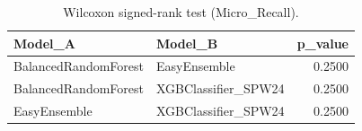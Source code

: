 \begin{table}[t]
\centering
\begin{tabular}{llr}
\toprule
Model_A & Model_B & p_value \\
\midrule
BalancedRandomForest & EasyEnsemble & 0.2500 \\
BalancedRandomForest & XGBClassifier_SPW24 & 0.2500 \\
EasyEnsemble & XGBClassifier_SPW24 & 0.2500 \\
\bottomrule
\end{tabular}
\caption{Wilcoxon signed-rank test (Micro_Recall).}
\label{tab:wilcoxon_Micro_Recall}
\end{table}